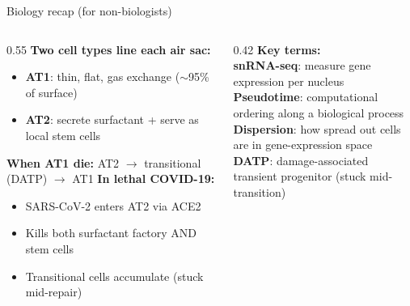 \documentclass[aspectratio=169]{beamer}
\begin{document}
\begin{frame}{Biology recap (for non-biologists)}
\begin{columns}[T]
\begin{column}{0.55\textwidth}
\textbf{Two cell types line each air sac:}
\begin{itemize}
  \item \textbf{AT1}: thin, flat, gas exchange ($\sim$95\% of surface)
  \item \textbf{AT2}: secrete surfactant + serve as local stem cells
\end{itemize}
\vspace{0.5em}
\textbf{When AT1 die:} AT2 $\to$ transitional (DATP) $\to$ AT1
\vspace{0.5em}
\textbf{In lethal COVID-19:}
\begin{itemize}
  \item SARS-CoV-2 enters AT2 via ACE2
  \item Kills both surfactant factory AND stem cells
  \item Transitional cells accumulate (stuck mid-repair)
\end{itemize}
\end{column}
\begin{column}{0.42\textwidth}
\small
\textbf{Key terms:}\\[3pt]
\textbf{snRNA-seq}: measure gene expression per nucleus\\[3pt]
\textbf{Pseudotime}: computational ordering along a biological process\\[3pt]
\textbf{Dispersion}: how spread out cells are in gene-expression space\\[3pt]
\textbf{DATP}: damage-associated transient progenitor (stuck mid-transition)
\end{column}
\end{columns}
\end{frame}
\end{document}
